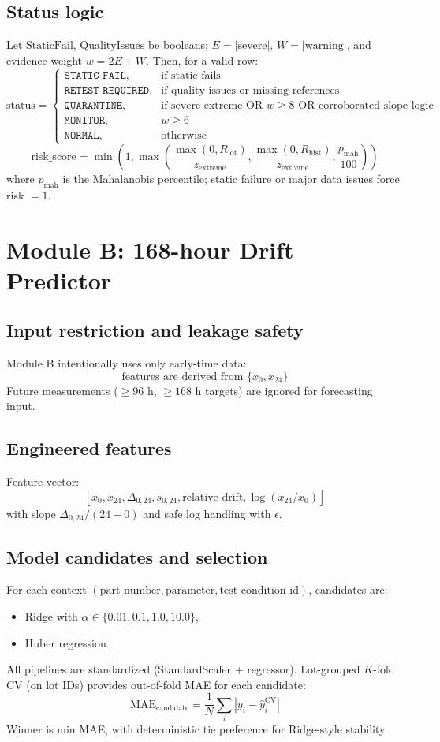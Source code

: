 \documentclass[11pt]{article}
\begin{document}
\subsection{Status logic}
Let \(\text{StaticFail}\), \(\text{QualityIssues}\) be booleans; \(E=|\text{severe}|\), \(W=|\text{warning}|\), and evidence weight \(w=2E+W\).  
Then, for a valid row:
\[
\text{status}=\begin{cases}
\texttt{STATIC\_FAIL}, & \text{if static fails}\\
\texttt{RETEST\_REQUIRED}, & \text{if quality issues or missing references}\\
\texttt{QUARANTINE}, & \text{if severe extreme OR } w\ge 8 \text{ OR corroborated slope logic}\\
\texttt{MONITOR}, & w\ge 6\\
\texttt{NORMAL}, & \text{otherwise}
\end{cases}
\]
\[
\text{risk\_score}=\min\left(1,\max\left(\frac{\max(0,R_{\mathrm{lot}})}{z_{\mathrm{extreme}}},\frac{\max(0,R_{\mathrm{hist}})}{z_{\mathrm{extreme}}},\frac{p_{\mathrm{mah}}}{100}\right)\right)
\]
where \(p_{\mathrm{mah}}\) is the Mahalanobis percentile; static failure or major data issues force risk \(=1\).

\section{Module B: 168-hour Drift Predictor}

\subsection{Input restriction and leakage safety}
Module B intentionally uses only early-time data:
\[
\text{features are derived from } \{x_{0},x_{24}\}
\]
Future measurements (\(\ge 96\) h, \(\ge 168\) h targets) are ignored for forecasting input.

\subsection{Engineered features}
Feature vector:
\[
[x_{0},x_{24},\Delta_{0,24},s_{0,24},\text{relative\_drift},\log(x_{24}/x_0)]
\]
with slope \(\Delta_{0,24}/(24-0)\) and safe log handling with \(\epsilon\).

\subsection{Model candidates and selection}
For each context \((\text{part\_number},\text{parameter},\text{test\_condition\_id})\), candidates are:
\begin{itemize}[nosep]
  \item Ridge with \(\alpha\in\{0.01,0.1,1.0,10.0\}\),
  \item Huber regression.
\end{itemize}
All pipelines are standardized (StandardScaler + regressor).  
Lot-grouped \(K\)-fold CV (on lot IDs) provides out-of-fold MAE for each candidate:
\[
\mathrm{MAE}_{\text{candidate}}=\frac1N\sum_i|y_i-\hat y_i^{\mathrm{CV}}|
\]
Winner is min MAE, with deterministic tie preference for Ridge-style stability.
\end{document}
